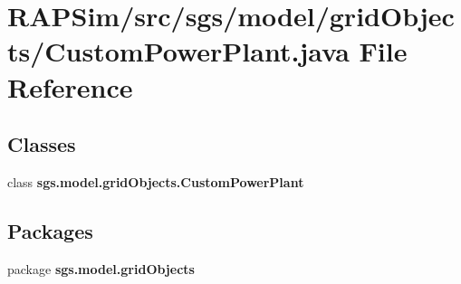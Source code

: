 \section{R\-A\-P\-Sim/src/sgs/model/grid\-Objects/\-Custom\-Power\-Plant.java File Reference}
\label{_custom_power_plant_8java}
\subsection*{Classes}
\begin{DoxyCompactItemize}
\item 
class {\bf sgs.\-model.\-grid\-Objects.\-Custom\-Power\-Plant}
\end{DoxyCompactItemize}
\subsection*{Packages}
\begin{DoxyCompactItemize}
\item 
package {\bf sgs.\-model.\-grid\-Objects}
\end{DoxyCompactItemize}
